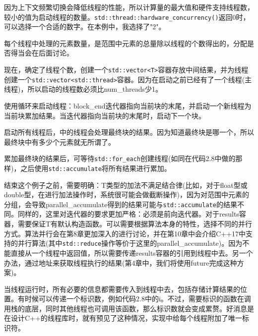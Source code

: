 因为上下文频繁切换会降低线程的性能，所以计算量的最大值和硬件支持线程数，较小的值为启动线程的数量。\texttt{std::thread::hardware\_concurrency()}返回0时，可以选择一个合适的数字。在本例中，我选择了"2"。

每个线程中处理的元素数量，是范围中元素的总量除以线程的个数得出的，分配是否得当会在后面讨论。

现在，确定了线程个数，创建一个\texttt{std::vector<T>}容器存放中间结果，并为线程创建一个\texttt{std::vector<std::thread>}容器。因为在启动之前已经有了一个线程(主线程)，所以启动的线程数必须比num\_threads少1。

使用循环来启动线程：block\_end迭代器指向当前块的末尾，并启动一个新线程为当前块累加结果。当迭代器指向当前块的末尾时，启动下一个块。

启动所有线程后，中的线程会处理最终块的结果。因为知道最终块是哪一个，所以最终块中有多少个元素就无所谓了。

累加最终块的结果后，可等待\texttt{std::for\_each}创建线程(如同在代码2.8中做的那样)，之后使用\texttt{std::accumulate}将所有结果进行累加。

结束这个例子之前，需要明确：T类型的加法不满足结合律(比如，对于float型或double型，在进行加法操作时，系统很可能会做截断操作)，因为对范围中元素的分组，会导致parallel\_accumulate得到的结果可能与\texttt{std::accumulate}的结果不同。同样的，这里对迭代器的要求更加严格：必须是前向迭代器。对于results容器，需要保证T有默认构造函数。可以需要根据算法本身的特性，选择不同的并行方式。算法并行会在第8章更加深入的进行讨论，并在第10章中会介绍C++17中支持的并行算法(其中\texttt{std::reduce}操作等价于这里的parallel\_accumulate)。因为不能直接从一个线程中返回值，所以需要传递results容器的引用到线程中去。另一个办法，通过地址来获取线程执行的结果(第4章中，我们将使用future完成这种方案)。

当线程运行时，所有必要的信息都需要传入到线程中去，包括存储计算结果的位置。有时候可以传递一个标识数，例如代码2.8中的i。不过，需要标识的函数在调用栈的底层，同时其他线程也可调用该函数，那么标识数就会变成累赘。好消息是在设计C++的线程库时，就有预见了这种情况，实现中给每个线程附加了唯一标识符。